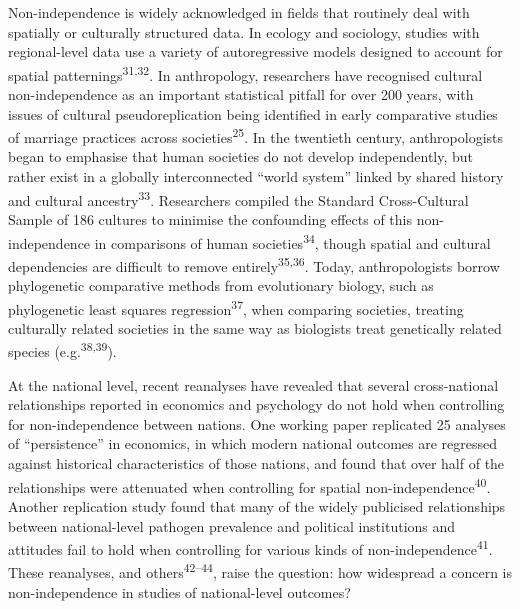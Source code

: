 \documentclass[
  man,floatsintext]{apa6}
\begin{document}
Non-independence is widely acknowledged in fields that routinely deal with spatially or culturally structured data. In ecology and sociology, studies with regional-level data use a variety of autoregressive models designed to account for spatial patternings\textsuperscript{31,32}. In anthropology, researchers have recognised cultural non-independence as an important statistical pitfall for over 200 years, with issues of cultural pseudoreplication being identified in early comparative studies of marriage practices across societies\textsuperscript{25}. In the twentieth century, anthropologists began to emphasise that human societies do not develop independently, but rather exist in a globally interconnected ``world system'' linked by shared history and cultural ancestry\textsuperscript{33}. Researchers compiled the Standard Cross-Cultural Sample of 186 cultures to minimise the confounding effects of this non-independence in comparisons of human societies\textsuperscript{34}, though spatial and cultural dependencies are difficult to remove entirely\textsuperscript{35,36}. Today, anthropologists borrow phylogenetic comparative methods from evolutionary biology, such as phylogenetic least squares regression\textsuperscript{37}, when comparing societies, treating culturally related societies in the same way as biologists treat genetically related species (e.g.\textsuperscript{38,39}).

At the national level, recent reanalyses have revealed that several cross-national relationships reported in economics and psychology do not hold when controlling for non-independence between nations. One working paper replicated 25 analyses of ``persistence'' in economics, in which modern national outcomes are regressed against historical characteristics of those nations, and found that over half of the relationships were attenuated when controlling for spatial non-independence\textsuperscript{40}. Another replication study found that many of the widely publicised relationships between national-level pathogen prevalence and political institutions and attitudes fail to hold when controlling for various kinds of non-independence\textsuperscript{41}. These reanalyses, and others\textsuperscript{42--44}, raise the question: how widespread a concern is non-independence in studies of national-level outcomes?
\end{document}
